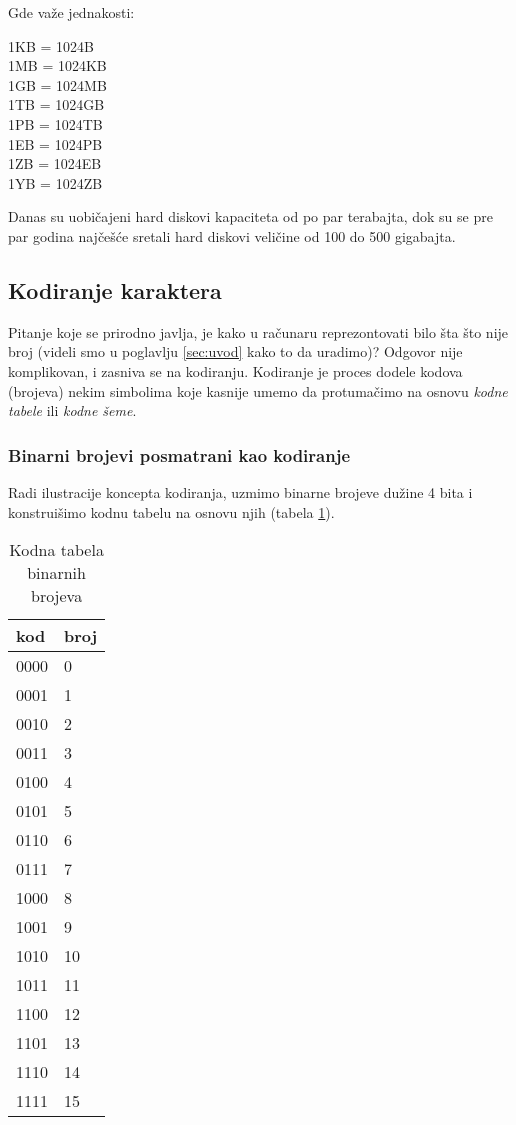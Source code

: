\documentclass[a4paper]{article}
\begin{document}
Gde važe jednakosti:

\begin{center}
 1KB = 1024B \\
 1MB = 1024KB \\
 1GB = 1024MB \\
 1TB = 1024GB \\
 1PB = 1024TB \\
 1EB = 1024PB \\
 1ZB = 1024EB \\
 1YB = 1024ZB \\
\end{center}

Danas su uobičajeni hard diskovi kapaciteta od po par terabajta, dok su se pre par godina najčešće sretali hard diskovi veličine od 100 do 500 gigabajta. 

\subsection{Kodiranje karaktera}
Pitanje koje se prirodno javlja, je kako u računaru reprezontovati bilo šta što nije broj (videli smo u poglavlju \ref{sec:uvod} kako to da uradimo)? Odgovor nije komplikovan, i zasniva se na kodiranju.
Kodiranje je proces dodele kodova (brojeva) nekim simbolima koje kasnije umemo da protumačimo na osnovu \emph{kodne tabele} ili \emph{kodne šeme}. 

\subsubsection{Binarni brojevi posmatrani kao kodiranje}
Radi ilustracije koncepta kodiranja, uzmimo binarne brojeve dužine 4 bita i konstruišimo kodnu tabelu na osnovu njih (tabela \ref{tabela_binarni}). 

\begin{table}[h!]
\centering
\begin{tabular}{|l|l|}
\hline
kod & broj \\ \hline
0000 & 0  \\ \hline
0001 & 1  \\ \hline
0010 & 2  \\ \hline
0011 & 3  \\ \hline
0100 & 4  \\ \hline
0101 & 5  \\ \hline
0110 & 6  \\ \hline
0111 & 7  \\ \hline
1000 & 8  \\ \hline
1001 & 9  \\ \hline
1010 & 10 \\ \hline
1011 & 11 \\ \hline
1100 & 12 \\ \hline
1101 & 13 \\ \hline
1110 & 14 \\ \hline
1111 & 15 \\ \hline
\end{tabular}
\caption{Kodna tabela binarnih brojeva}
\label{tabela_binarni}
\end{table}
\end{document}
